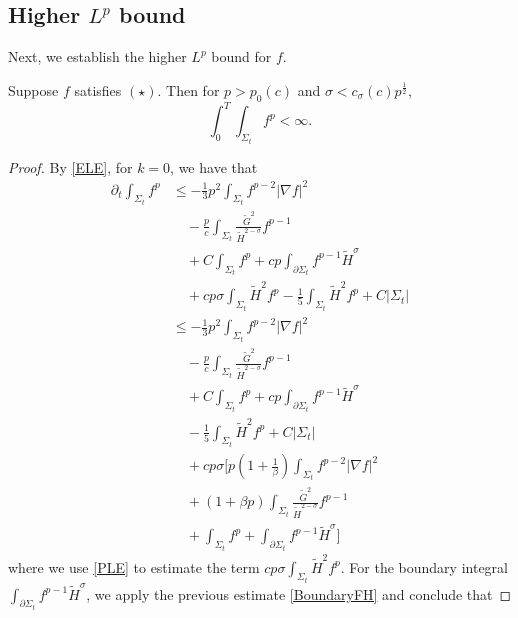\subsection{Higher $L^p$ bound}
Next, we establish the higher $L^p$ bound for $f$.

\begin{lemma}
    Suppose $f$ satisfies $(\star)$. Then for $p>p_0(c)$ and $\sigma < c_{\sigma }(c)p^{\frac{1}{2}}$,
    \[\int_{0}^{T}\int_{\Sigma_t} f^p<\infty .\]  
\end{lemma}

\begin{proof}
    By \autoref{ELE}, for $k=0$, we have that
    \begin{equation}
    \begin{split}
        \partial_t \int_{\Sigma_t} f^p
        &\leq   -\frac{1}{3}p^2 \int_{\Sigma_t} f^{p-2}\left| \nabla f \right| ^2  \\
        & \quad -\frac{p}{c} \int_{\Sigma_t} \frac{\tilde{G}^2}{\tilde{H}^{2-\sigma }}f^{p-1}\\
        &\quad +C \int_{\Sigma_t} f^p+cp\int_{\partial \Sigma_t} f^{p-1}\tilde{H}^{\sigma }\\
        &\quad +cp \sigma \int_{\Sigma_t}^{}\tilde{H}^2f^p-\frac{1}{5}\int_{\Sigma_t} \tilde{H}^2f^{p}+C \left| \Sigma_t \right| \\
        &\leq   -\frac{1}{3}p^2 \int_{\Sigma_t} f^{p-2}\left| \nabla f \right| ^2  \\
        & \quad -\frac{p}{c} \int_{\Sigma_t} \frac{\tilde{G}^2}{\tilde{H}^{2-\sigma }}f^{p-1}\\
        &\quad +C \int_{\Sigma_t} f^p+cp\int_{\partial \Sigma_t} f^{p-1}\tilde{H}^{\sigma }\\
        &\quad -\frac{1}{5}\int_{\Sigma_t} \tilde{H}^2f^{p}+C \left| \Sigma_t \right| \\
        &\quad +cp \sigma [ p \left( 1+\frac{1}{\beta } \right) \int_{\Sigma_t} f^{p-2}\left| \nabla f \right| ^2   \\
        &\quad +\left( 1+\beta p \right) \int_{\Sigma_t} \frac{\tilde{G}^2}{\tilde{H}^{2-\sigma }}f^{p-1} \\
        &\quad +\int_{\Sigma_t} f^p+\int_{\partial \Sigma_t} f^{p-1}\tilde{H}^{\sigma } ] 
    \end{split}
    \end{equation} 
    where we use \autoref{PLE} to estimate the term $cp \sigma \int_{\Sigma_t}^{}\tilde{H}^2f^p$.
    For the boundary integral $\int_{\partial \Sigma_t} f^{p-1}\tilde{H}^{\sigma }$, we apply the previous estimate \autoref{BoundaryFH} and conclude that 

\end{proof}
